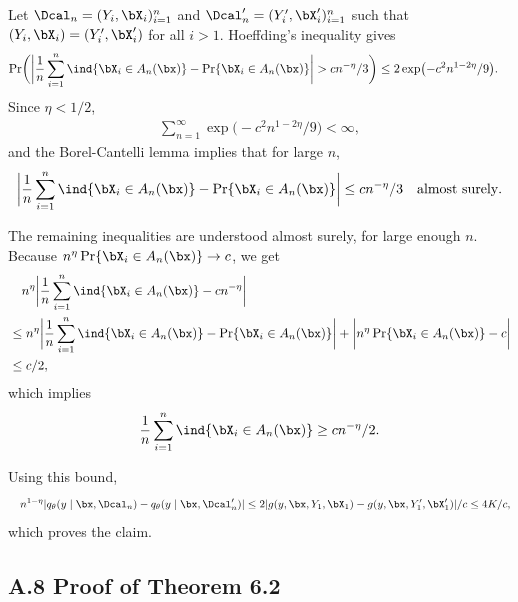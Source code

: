 \documentclass[aspectratio=169,10pt]{beamer}
\newcommand{\currentheading}{\ifx\insertsubsection\empty\insertsection\else\insertsubsection\fi}
\begin{document}
\begin{frame}{\currentheading}
\small
Let $\Dcal_n = (Y_i, \bX_i)_{i = 1}^n$ and $\Dcal_n' = (Y_i', \bX_i')_{i = 1}^n$ such that $(Y_i, \bX_i) = (Y_i', \bX_i')$ for all $i > 1$. Hoeffding's inequality gives
\begin{align*}
	\Pr\biggl(\biggl| \frac 1 n \sum_{i = 1}^n  \ind\{\bX_i \in A_n(\bx)\} -\Pr\{\bX_i \in A_n(\bx)\} \biggr| >  c n^{-\eta} / 3 \biggr) &\le 2\exp\bigl(-c^2 n^{1-2\eta} / 9\bigr).
\end{align*}
Since $\eta < 1/2$,
\begin{align*}
	\sum_{n = 1}^\infty \exp\bigl(-c^2 n^{1-2\eta} / 9\bigr) < \infty,
\end{align*}
and the Borel-Cantelli lemma implies that for large $n$,
\begin{align*}
	\biggl| \frac 1 n \sum_{i = 1}^n  \ind\{\bX_i \in A_n(\bx)\} -\Pr\{\bX_i \in A_n(\bx)\} \biggr| \le  c n^{-\eta} / 3  \quad \text{almost surely}.
\end{align*}
\end{frame}

\begin{frame}{\currentheading}
\small
The remaining inequalities are understood almost surely, for large enough $n$. Because $n^\eta\Pr\{\bX_i \in A_n(\bx)\} \to c$, we get
\begin{align*}
	&\quad n^\eta \biggl| \frac 1 n \sum_{i = 1}^n  \ind\{\bX_i \in A_n(\bx)\} - c n^{-\eta} \biggr| \\
	&\le n^\eta \biggl| \frac 1 n \sum_{i = 1}^n  \ind\{\bX_i \in A_n(\bx)\} - \Pr\{\bX_i \in A_n(\bx)\} \biggr| + \biggl|	n^\eta\Pr\{\bX_i \in A_n(\bx)\} - c \biggr| \\
	&\le c / 2 ,
\end{align*}
which implies
\begin{align*}
\frac 1 n \sum_{i = 1}^n  \ind\{\bX_i \in A_n(\bx)\} \ge cn^{-\eta}/2.
\end{align*}
\end{frame}

\begin{frame}{\currentheading}
Using this bound,
\begin{align*}
\quad n^{1- \eta}|q_{\theta}(y \mid \bx, \Dcal_n) - q_{\theta}(y \mid \bx, \Dcal_n')|
\le 2 |g(y, \bx, Y_1, \bX_1) - g(y, \bx, Y_1', \bX_1')| / c \le 4K / c,
\end{align*}
which proves the claim.
\end{frame}

\subsection{A.8 Proof of Theorem 6.2}
\end{document}
